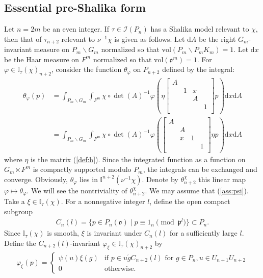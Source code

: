 \documentclass[11pt]{amsart}
\newcommand\vp{\varphi}%
\newcommand\oo{\mathfrak{o}}
\newcommand\p{{\mathfrak{p}}}
\newcommand\dr{\mathrm{d}}
\newcommand\Ib{{\mathbb{I}}}
\newcommand\1{\mathbf{1}}
\newcommand\ac{\acute}
\newcommand\bs{\backslash}%
\newcommand\vol{{\mathrm{vol}}}
\newcommand\Ir{{\mathscr{I}}}
\numberwithin{equation}{section}
\begin{document}
\subsection{Essential pre-Shalika form}\label{subsec:spsf}
Let $n = 2m$ be an even integer. 
If $\tau \in \Ir(P_n)$ has a Shalika model relevant to $\chi$, then that of $\tau_{n+2}$ relevant to $\nu^{-1}\chi$ is given as follows.
Let $\dr A$ be the right $G_m$-invariant measure on $P_m \bs G_m$ normalized so that $\vol(P_m \bs P_mK_m) = 1$.
Let $\dr x$ be the Haar measure on $F^m$ normalized so that $\vol(\oo^m) = 1$.
For $\vp \in \Ib_\tau(\chi)_{n+2}$, consider the function $\theta_\vp$ on $P_{n+2}$ defined by the integral: 
\begin{align*}
\theta_\vp(p) &= \int_{P_m \bs G_{m}} \int_{F^m}\chi \circ \det(A)^{-1} \vp(\eta \begin{bmatrix}
A & & &  \\
&1 & x & \\
& & A &  \\
& & &1  \\
\end{bmatrix}p) \dr x \dr A \\
&= \int_{P_m \bs G_{m}} \int_{F^m}  \chi \circ \det(A)^{-1} \vp(\begin{bmatrix}
A & & &  \\
&A &  & \\
& x & 1 &  \\
& & &1  \\
\end{bmatrix}\eta p) \dr x \dr A
\end{align*} 
where $\eta$ is the matrix (\ref{def:h}).
Since the integrated function as a function on $G_m \ltimes F^{m}$ is compactly supported modulo $P_m$, the integrals can be exchanged and converge.
Obviously, $\theta_\vp$ lies in $\Ib^{n+2}(\nu^{-1}\chi)$.
Denote by $\theta_{n+2}^\chi$ this linear map $\vp \mapsto \theta_\vp$.
We will see the nontriviality of $\theta_{n+2}^\chi$.
We may assume that (\ref{ass:psi}). 
Take a $\xi \in \Ib_\tau(\chi)$. 
For a nonnegative integer $l$, define the open compact subgroup 
\begin{align*}
C_n(l) = \{p \in P_{n}(\oo) \mid p \equiv 1_{n} \pmod{\p^l} \} \subset P_{n}.
\end{align*}
Since $\Ib_\tau(\chi)$ is smooth, $\xi$ is invariant under $C_{n}(l)$ for a sufficiently large $l$.
Define the $C_{n+2}(l)$-invariant $\vp_\xi \in \Ib_\tau(\chi)_{n+2}$ by 
\begin{align*}
\vp_\xi(p) = 
\begin{cases}
\psi(u) \xi(g) & \mbox{if $p \in  u \ac{g} C_{n+2}(l)$ for $g \in P_{n}, u \in U_{n+1}U_{n+2}$} \\
0 & \mbox{otherwise.} 
\end{cases}
 \end{align*}
\end{document}
